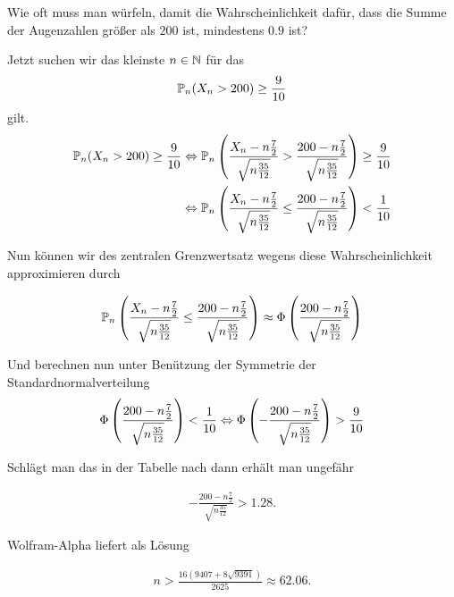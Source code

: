 \begin{exercise}

Wie oft muss man würfeln, damit die Wahrscheinlichkeit dafür, dass die Summe der Augenzahlen größer als $200$ ist, mindestens $0.9$ ist?

\end{exercise}

\begin{solution}

Jetzt suchen wir das kleinste $n \in \N$ für das
\begin{align*}
    \P_n(X_n > 200) \geq \frac{9}{10}
\end{align*}
gilt.
\begin{align*}
    \P_n(X_n > 200) \geq \frac{9}{10} &\Leftrightarrow \P_n\pbraces{\frac{X_n-n\frac{7}{2}}{\sqrt{n\frac{35}{12}}} > \frac{200 -n\frac{7}{2}}{\sqrt{n\frac{35}{12}}}} \geq \frac{9}{10} \\
    &\Leftrightarrow \P_n\pbraces{\frac{X_n-n\frac{7}{2}}{\sqrt{n\frac{35}{12}}} \leq \frac{200 -n\frac{7}{2}}{\sqrt{n\frac{35}{12}}}} < \frac{1}{10}
\end{align*}

Nun können wir des zentralen Grenzwertsatz wegens diese Wahrscheinlichkeit approximieren durch

\begin{align*}
    \P_n\pbraces{\frac{X_n-n\frac{7}{2}}{\sqrt{n\frac{35}{12}}} \leq \frac{200 -n\frac{7}{2}}{\sqrt{n\frac{35}{12}}}} \approx \Phi\pbraces{\frac{200 -n\frac{7}{2}}{\sqrt{n\frac{35}{12}}}}
\end{align*}

Und berechnen nun unter Benützung der Symmetrie der Standardnormalverteilung
\begin{align*}
    \Phi\pbraces{\frac{200 -n\frac{7}{2}}{\sqrt{n\frac{35}{12}}}} < \frac{1}{10} \Leftrightarrow \Phi\pbraces{-\frac{200 -n\frac{7}{2}}{\sqrt{n\frac{35}{12}}}} > \frac{9}{10}
\end{align*}

Schlägt man das in der Tabelle nach dann erhält man ungefähr

\begin{align*}
    -\frac{200 -n\frac{7}{2}}{\sqrt{n\frac{35}{12}}} > 1.28.
\end{align*}

Wolfram-Alpha liefert als Lösung

\begin{align*}
    n > \frac{16(9407+8\sqrt{9391})}{2625} \approx 62.06.
\end{align*}

\end{solution}
